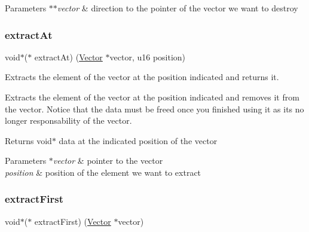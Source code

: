 \begin{DoxyParams}{Parameters}
{\em $\ast$$\ast$vector} & direction to the pointer of the vector we want to destroy \\
\hline
\end{DoxyParams}
\mbox{\label{structadt__vector__ops__s_ae9a65728128edd1d8fe6653e4fb16bad}} 
\subsubsection{\texorpdfstring{extract\+At}{extractAt}}
{\footnotesize\ttfamily void$\ast$($\ast$ extract\+At) (\hyperlink{structadt__vector__s}{Vector} $\ast$vector, u16 position)}



Extracts the element of the vector at the position indicated and returns it. 

Extracts the element of the vector at the position indicated and removes it from the vector. Notice that the data must be freed once you finished using it as it\textquotesingle{}s no longer responsability of the vector.

\begin{DoxyReturn}{Returns}
void$\ast$ data at the indicated position of the vector 
\end{DoxyReturn}

\begin{DoxyParams}{Parameters}
{\em $\ast$vector} & pointer to the vector \\
\hline
{\em position} & position of the element we want to extract \\
\hline
\end{DoxyParams}
\mbox{\label{structadt__vector__ops__s_af2b81db8a8c6de300a0c534b706c3147}} 
\subsubsection{\texorpdfstring{extract\+First}{extractFirst}}
{\footnotesize\ttfamily void$\ast$($\ast$ extract\+First) (\hyperlink{structadt__vector__s}{Vector} $\ast$vector)}



